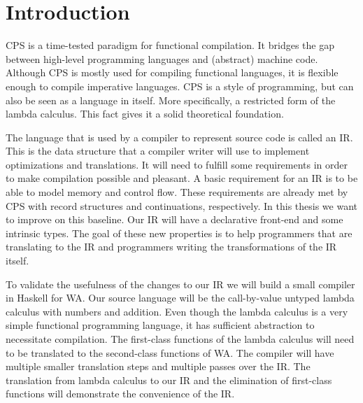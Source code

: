 
\chapter{\label{chap:introduction}Introduction}

CPS is a time-tested paradigm for functional compilation\autocite{steele1978rabbit, DBLP:books/daglib/0022396}. It bridges the gap between high-level programming languages and (abstract) machine code. Although \ac{CPS} is mostly used for compiling functional languages, it is flexible enough to compile imperative languages. \ac{CPS} is a style of programming, but can also be seen as a language in itself. More specifically, a restricted form of the lambda calculus\autocite{barendregt1984lambda}. This fact gives it a solid theoretical foundation.

The language that is used by a compiler to represent source code is called an \ac{IR}. This is the data structure that a compiler writer will use to implement optimizations and translations. It will need to fulfill some requirements in order to make compilation possible and pleasant. A basic requirement for an \ac{IR} is to be able to model memory and control flow\autocite{bruin2020framevm}. These requirements are already met by \ac{CPS} with record structures and continuations, respectively. In this thesis we want to improve on this baseline. Our \ac{IR} will have a declarative front-end and some intrinsic types. The goal of these new properties is to help programmers that are translating to the \ac{IR} and programmers writing the transformations of the \ac{IR} itself.

To validate the usefulness of the changes to our \ac{IR} we will build a small compiler in Haskell\autocite{haskellhomepage} for \ac{WA}\autocite{webassemblyhomepage}. Our source language will be the call-by-value untyped lambda calculus with numbers and addition. Even though the lambda calculus is a very simple functional programming language, it has sufficient abstraction to necessitate compilation. The first-class functions of the lambda calculus will need to be translated to the second-class functions of \ac{WA}. The compiler will have multiple smaller translation steps and multiple passes over the \ac{IR}. The translation from lambda calculus to our \ac{IR} and the elimination of first-class functions will demonstrate the convenience of the \ac{IR}.

